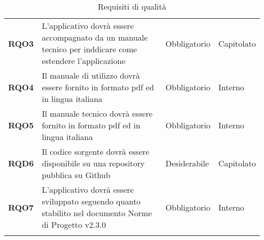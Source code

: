 \begin{longtable}[H]{| >{\raggedright\bfseries}m{20mm} | >{\raggedright}m{90mm} | >{\centering}m{25mm} | >{\centering\arraybackslash}m{30mm}|}
    RQO3
     & L'applicativo dovrà essere accompagnato da un manuale tecnico per inddicare come estendere l'applicazione
     & Obbligatorio
     & Capitolato                                                                                                           \\

    RQO4
     & Il manuale di utilizzo dovrà essere fornito in formato pdf ed in lingua italiana
     & Obbligatorio
     & Interno                                                                                                              \\

    RQO5
     & Il manuale tecnico dovrà essere fornito in formato pdf ed in lingua italiana
     & Obbligatorio
     & Interno                                                                                                              \\

    RQD6
     & Il codice sorgente dovrà essere disponibile su una repository pubblica su Github
     & Desiderabile
     & Capitolato                                                                                                           \\

    RQO7
     & L'applicativo dovrà essere sviluppato seguendo quanto stabilito nel documento Norme di Progetto v2.3.0
     & Obbligatorio
     & Interno                                                                                                              \\
    \hline
    \rowcolor{white}
    \caption{Requisiti di qualità}%
    \label{tab:requisiti_di_qualita}
\end{longtable}
